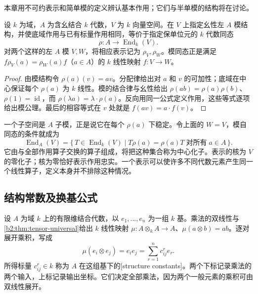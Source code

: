 本章用不可约表示和简单模的定义辨认基本作用；它们与半单模的结构将在讨论。

\begin{proposition}\label{b2:prop:algebra-modules-representations}
	设 \(k\) 为域，\(A\) 为含幺结合 \(k\) 代数，\(V\) 为 \(k\) 向量空间。在 \(V\) 上指定幺性左 \(A\) 模结构，并使底域作用与已有标量作用相同，等价于指定保单位元的 \(k\) 代数同态
	\[
		\rho:A\longrightarrow\operatorname{End}_k(V).
	\]
	对两个这样的左 \(A\) 模 \(V,W\)，将相应表示记为 \(\rho_V,\rho_W\)。模同态正是满足 \(f\rho_V(a)=\rho_W(a)f\)（\(a\in A\)）的 \(k\) 线性映射 \(f:V\to W\)。
\end{proposition}
\begin{proof}
	由模结构令 \(\rho(a)(v)=av\)。分配律给出对 \(a\) 和 \(v\) 的可加性；底域在中心保证每个 \(\rho(a)\) 为 \(k\) 线性。模的结合律与幺性给出 \(\rho(ab)=\rho(a)\rho(b)\)、\(\rho(1)=\operatorname{id}\)，而 \(\rho(\lambda a)=\lambda\cdot\rho(a)\)。反向用同一公式定义作用，这些等式逐项给出模公理。最后的相容等式在 \(v\) 处就是 \(f(av)=a\cdot f(v)\)。
\end{proof}

一个子空间是 \(A\) 子模，正是说它在每个 \(\rho(a)\) 下稳定。令上面的 \(W=V\)，模自同态的条件就成为
\[
	\operatorname{End}_A(V) =\{\,T\in\operatorname{End}_k(V)\mid T\rho(a)=\rho(a)T\;\text{对所有}\;a\in A\,\}.
\]
它由与全部作用算子交换的算子组成，将把这种集合称为中心化子。表示的核为 \(V\) 的零化子；核为零恰好表示作用忠实。一个表示可以使许多不同代数元素产生同一个线性算子，定义本身并不排除这种情况。

\subsection{结构常数及换基公式}
\label{b2:subsec:1101:02}

设 \(A\) 为域 \(k\) 上的有限维结合代数，以 \(e_1,\ldots,e_n\) 为一组 \(k\) 基。乘法的双线性与\cref{b2:thm:tensor-universal}给出 \(k\) 线性映射 \(\mu:A\otimes_kA\to A\)、\(\mu(a\otimes b)=ab\)。逐对展开乘积，写成
\[
	\mu(e_i\otimes e_j)=e_ie_j=\sum_{r=1}^n c_{ij}^{r}e_r.
\]
所得标量 \(c_{ij}^{r}\in k\) 称为 \(A\) 在这组基下的[structure constants]。两个下标记录乘法的两个输入，上标记录输出坐标。它们决定全部乘法，因为两个一般元素的乘积可由双线性展开。

